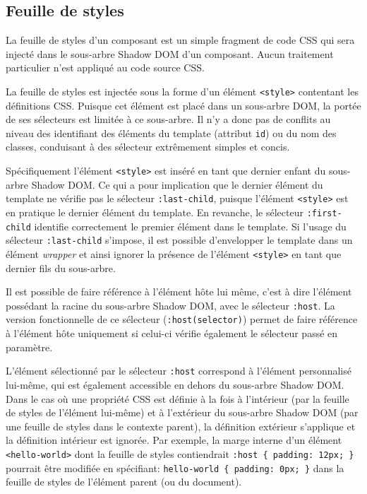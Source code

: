 \subsection{Feuille de styles}
La feuille de styles d'un composant est un simple fragment de code CSS qui sera injecté dans le sous-arbre Shadow DOM d'un composant. Aucun traitement particulier n'est appliqué au code source CSS.

La feuille de styles est injectée sous la forme d'un élément \texttt{<style>} contentant les définitions CSS. Puisque cet élément est placé dans un sous-arbre DOM, la portée de ses sélecteurs est limitée à ce sous-arbre. Il n'y a donc pas de conflits au niveau des identifiant des éléments du template (attribut \texttt{id}) ou du nom des classes, conduisant à des sélecteur extrêmement simples et concis.

Spécifiquement l'élément \texttt{<style>} est inséré en tant que dernier enfant du sous-arbre Shadow DOM. Ce qui a pour implication que le dernier élément du template ne vérifie pas le sélecteur \texttt{:last-child}, puisque l'élément \texttt{<style>} est en pratique le dernier élément du template. En revanche, le sélecteur \texttt{:first-child} identifie correctement le premier élément dans le template. Si l'usage du sélecteur \texttt{:last-child} s'impose, il est possible d'envelopper le template dans un élément \emph{wrapper} et ainsi ignorer la présence de l'élément \texttt{<style>} en tant que dernier fils du sous-arbre.

Il est possible de faire référence à l'élément hôte lui même, c'est à dire l'élément possédant la racine du sous-arbre Shadow DOM, avec le sélecteur \texttt{:host}. La version fonctionnelle de ce sélecteur (\texttt{:host(selector)}) permet de faire référence à l'élément hôte uniquement si celui-ci vérifie également le sélecteur passé en paramètre.

L'élément sélectionné par le sélecteur \texttt{:host} correspond à l'élément personnalisé lui-même, qui est également accessible en dehors du sous-arbre Shadow DOM. Dans le cas où une propriété CSS est définie à la fois à l'intérieur (par la feuille de styles de l'élément lui-même) et à l'extérieur du sous-arbre Shadow DOM (par une feuille de styles dans le contexte parent), la définition extérieur s'applique et la définition intérieur est ignorée. Par exemple, la marge interne d'un élément \texttt{<hello-world>} dont la feuille de styles contiendrait \texttt{:host \{ padding: 12px; \}} pourrait être modifiée en spécifiant: \texttt{hello-world \{ padding: 0px; \}} dans la feuille de styles de l'élément parent (ou du document).

